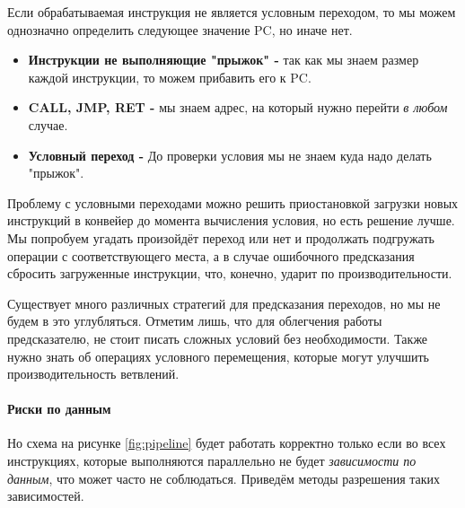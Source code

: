 \documentclass[12pt,a4paper]{article}
\begin{document}
Если обрабатываемая инструкция не является условным переходом, то мы можем однозначно определить следующее значение PC, но иначе нет.

\begin{itemize}
    \item \textbf{Инструкции не выполняющие "прыжок" - } так как мы знаем размер каждой инструкции, то можем прибавить его к PC.
    \item \textbf{CALL, JMP, RET - } мы знаем адрес, на который нужно перейти \textit{в любом} случае.
    \item \textbf{Условный переход - } До проверки условия мы не знаем куда надо делать "прыжок".
\end{itemize}

Проблему с условными переходами можно решить приостановкой загрузки новых инструкций в конвейер до момента вычисления условия, но есть решение лучше. Мы попробуем угадать произойдёт переход или нет и продолжать подгружать операции с соответствующего места, а в случае ошибочного предсказания сбросить загруженные инструкции, что, конечно, ударит по производительности.

Существует много различных стратегий для предсказания переходов, но мы не будем в это углубляться. Отметим лишь, что для облегчения работы предсказателю, не стоит писать сложных условий без необходимости. Также нужно знать об операциях условного перемещения, которые могут улучшить производительность ветвлений.

\paragraph{Риски по данным}
\indent 

Но схема на рисунке \ref{fig:pipeline} будет работать корректно только если во всех инструкциях, которые выполняются параллельно не будет \textit{зависимости по данным}, что может часто не соблюдаться. Приведём методы разрешения таких зависимостей.
\end{document}
